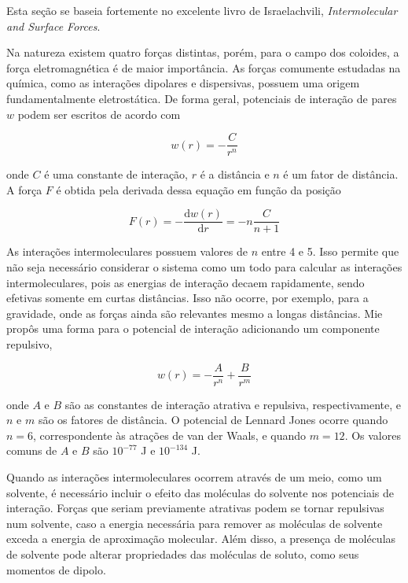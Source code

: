 	Esta seção se baseia fortemente no excelente livro de Israelachvili, \emph{Intermolecular and Surface Forces}\cite{Israelachvili2011}.
	
	Na natureza existem quatro forças distintas, porém, para o campo dos coloides, a força eletromagnética é de maior importância. As forças comumente estudadas na química, como as interações dipolares e dispersivas, possuem uma origem fundamentalmente eletrostática. De forma geral, potenciais de interação de pares \(w\) podem ser escritos de acordo com
	
	\begin{equation}
		w(r) = -\dfrac{C}{r^n}
		\label{eqn:energia_livre_generica}
	\end{equation} 
	
	\noindent onde \(C\) é uma constante de interação, \(r\) é a distância e \(n\) é um fator de distância. A força \(F\) é obtida pela derivada dessa equação em função da posição 
	
	\begin{equation}
		F(r) = -\dfrac{\mathrm{d}w(r)}{\mathrm{d}r} = -n \dfrac{C}{n+1}
		\label{eqn:forca_generica}
	\end{equation} 
	
	
	As interações intermoleculares possuem valores de \(n\) entre 4 e 5. Isso permite que não seja necessário considerar o sistema como um todo para calcular as interações intermoleculares, pois as energias de interação decaem rapidamente, sendo efetivas somente em curtas distâncias. Isso não ocorre, por exemplo, para a gravidade, onde as forças ainda são relevantes mesmo a longas distâncias. Mie propôs uma forma para o potencial de interação adicionando um componente repulsivo,
	
	\begin{equation}
		w(r) = -\dfrac{A}{r^n} + \dfrac{B}{r^m}
		\label{eqn:forca_mie}
	\end{equation}
	
	\noindent onde \(A\) e \(B\) são as constantes de interação atrativa e repulsiva, respectivamente, e \(n\) e \(m\) são os fatores de distância. O potencial de Lennard Jones ocorre quando \(n = 6\),  correspondente às atrações de van der Waals, e quando \(m = 12\). Os valores comuns de \(A\) e \(B\) são \(10^{-77}\) J e \(10^{-134}\) J.
	
	Quando as interações intermoleculares ocorrem através de um meio, como um solvente, é necessário incluir o efeito das moléculas do solvente nos potenciais de interação. Forças que seriam previamente atrativas podem se tornar repulsivas num solvente, caso a energia necessária para remover as moléculas de solvente exceda a energia de aproximação molecular. Além disso, a presença de moléculas de solvente pode alterar propriedades das moléculas de soluto, como seus momentos de dipolo.
	
